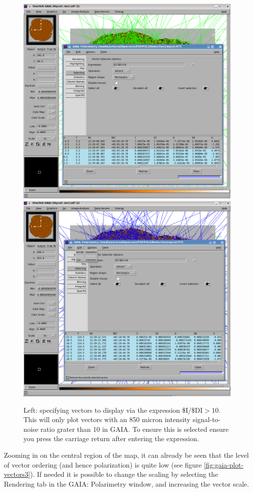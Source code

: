 \begin{figure}[t!]
\begin{center}
\includegraphics[width=0.46\linewidth]{sc22-gaia-plot-vectors-4.png}
\includegraphics[width=0.46\linewidth]{sc22-gaia-plot-vectors-6.png}
\label{fig:gaia-plot-vectors2}
\caption [Selecting Vectors in GAIA]{
  \small Left: specifying vectors to display via the expression \$I/\$DI$>$10. This will only plot
vectors with an 850 micron intensity signal-to-noise ratio grater than 10 in GAIA. To ensure this is selected
ensure you press the carriage return after entering the expression. 
}
\end{center}
\end{figure}

Zooming in on the central region of the map, it can already be seen that the level of vector ordering 
(and hence polarization) is quite low (see figure \ref{fig:gaia-plot-vectors3}). If needed it is 
possible to change the scaling by selecting the Rendering tab in the GAIA: Polarimetry 
window, and increasing the vector scale.


